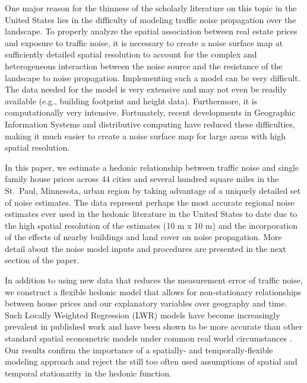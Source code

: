 \documentclass{article}\usepackage{graphicx, color}
\begin{document}
One major reason for the thinness of the scholarly literature on this topic in the United States lies in the difficulty of modeling traffic noise propagation over the landscape. To properly analyze the spatial association between real estate prices and exposure to traffic noise, it is necessary to create a noise surface map at sufficiently detailed spatial resolution to account for the complex and heterogeneous interaction between the noise source and the resistance of the landscape to noise propagation.  Implementing such a model can be very difficult.  The data needed for the model is very extensive and may not even be readily available (e.g., building footprint and height data).  Furthermore, it is computationally very intensive. Fortunately, recent developments in Geographic Information Systems and distributive computing have reduced these difficulties, making it much easier to create a noise surface map for large areas with high spatial resolution.  

In this paper, we estimate a hedonic relationship between traffic noise and single family house prices across 44 cities and several hundred square miles in the St.\ Paul, Minnesota, urban region by taking advantage of a uniquely detailed set of noise estimates. The data represent perhaps the most accurate regional noise estimates ever used in the hedonic literature in the United States to date due to the high spatial resolution of the estimates (10 m x 10 m) and the incorporation of the effects of nearby buildings and land cover on noise propagation. More detail about the noise model inputs and procedures are presented in the next section of the paper. 

In addition to using new data that reduces the measurement error of traffic noise, we construct a flexible hedonic model that allows for non-stationary relationships between house prices and our explanatory variables over geography and time. Such Locally Weighted Regression (LWR) models have become increasingly prevalent in published work \citep[see][]{MarmolejoDuarteCarlos;GonzalezTamez2009, McMillen2010, Carruthers2010, Sunding2010, Nappi-Choulet2011} and have been shown to be more accurate than other standard spatial econometric models under common real world circumstances \citep{McMillen2012}. Our results confirm the importance of a spatially- and temporally-flexible modeling approach and reject the still too often used assumptions of spatial and temporal stationarity in the hedonic function.
\end{document}
